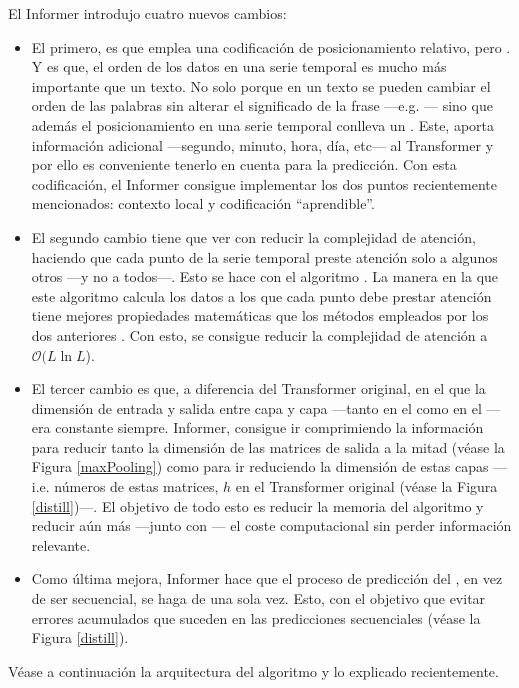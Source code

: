 {El Informer introdujo cuatro nuevos cambios:
\begin{itemize}
    \item El primero, es que emplea una codificación de posicionamiento relativo, pero . Y es que, el orden de los datos en una serie temporal es mucho más importante que un texto. No solo porque en un texto se pueden cambiar el orden de las palabras sin alterar el significado de la frase ---e.g. --- sino que además el posicionamiento en una serie temporal conlleva un . Este, aporta información adicional ---segundo, minuto, hora, día, etc--- al Transformer y por ello es conveniente tenerlo en cuenta para la predicción. Con esta codificación, el Informer consigue implementar los dos puntos recientemente mencionados: contexto local y codificación ``aprendible''\fnm.
    \item El segundo cambio tiene que ver con reducir la complejidad de atención, haciendo que cada punto de la serie temporal preste atención solo a algunos otros ---y no a todos---. Esto se hace con el algoritmo \fnm. La manera en la que este algoritmo calcula los datos a los que cada punto debe prestar atención tiene mejores propiedades matemáticas que los métodos empleados por los dos anteriores \parencite{SparseTransformer} \parencite{logSparse}. Con esto, se consigue reducir la complejidad de atención a $\mathcal{O}(L \ln L$).
    
    \item El tercer cambio es que, a diferencia del Transformer original, en el que la dimensión de entrada y  salida entre capa y capa ---tanto en el  como en el --- era constante siempre. Informer, consigue ir comprimiendo la información para reducir tanto la dimensión de las matrices de salida a la mitad\fnm \hspace{1.5pt} (véase la Figura \ref{maxPooling}) como para ir reduciendo la dimensión de estas capas ---i.e.  números de estas matrices, $h$ en el Transformer original (véase la Figura \ref{distill})---. El objetivo de todo esto es reducir la memoria del algoritmo y reducir aún más ---junto con --- el coste computacional sin perder información relevante.
    \item Como última mejora, Informer hace que el proceso  de predicción del , en vez de ser secuencial, se haga de una sola vez. Esto, con el objetivo que evitar errores acumulados que suceden en las predicciones  secuenciales (véase la Figura \ref{distill}).
\end{itemize}
\addtocounter{footnote}{1}
\addtocounter{footnote}{1}
Véase a continuación la arquitectura del algoritmo y lo explicado recientemente.

}

